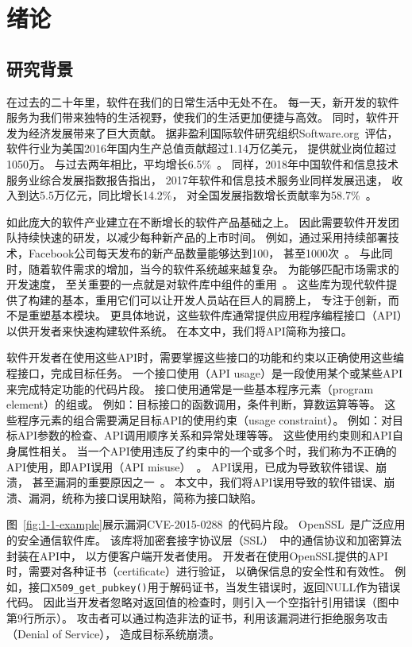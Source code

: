 \chapter{绪论}
\label{cha:intro}

\section{研究背景}
在过去的二十年里，软件在我们的日常生活中无处不在。
每一天，新开发的软件服务为我们带来独特的生活视野，使我们的生活更加便捷与高效。
同时，软件开发为经济发展带来了巨大贡献。
据非盈利国际软件研究组织Software.org~\cite{software-org}评估，
软件行业为美国2016年国内生产总值贡献超过1.14万亿美元，
提供就业岗位超过1050万。
与过去两年相比，平均增长6.5\%~\cite{2017-eco-report}。
同样，2018年中国软件和信息技术服务业综合发展指数报告指出，
2017年软件和信息技术服务业同样发展迅速，
收入到达5.5万亿元，同比增长14.2\%，
对全国发展指数增长贡献率为58.7\%~\cite{2018-china-report}。


如此庞大的软件产业建立在不断增长的软件产品基础之上。
因此需要软件开发团队持续快速的研发，以减少每种新产品的上市时间。
例如，通过采用持续部署技术，Facebook公司每天发布的新产品数量能够达到100，
甚至1000次~\cite{16-icse-continuous}。
与此同时，随着软件需求的增加，当今的软件系统越来越复杂。
为能够匹配市场需求的开发速度，
至关重要的一点就是对软件库中组件的重用~\cite{2011-icsr-reuse, 2013-cbse-reuse}。
这些库为现代软件提供了构建的基本，重用它们可以让开发人员站在巨人的肩膀上，
专注于创新，而不是重塑基本模块。
更具体地说，这些软件库通常提供应用程序编程接口（API）以供开发者来快速构建软件系统。
在本文中，我们将API简称为接口。


软件开发者在使用这些API时，需要掌握这些接口的功能和约束以正确使用这些编程接口，完成目标任务。
一个接口使用（API usage）是一段使用某个或某些API来完成特定功能的代码片段。
接口使用通常是一些基本程序元素（program element）的组或。
例如：目标接口的函数调用，条件判断，算数运算等等。
这些程序元素的组合需要满足目标API的使用约束（usage constraint）。
例如：对目标API参数的检查、API调用顺序关系和异常处理等等。
这些使用约束则和API自身属性相关。
当一个API使用违反了约束中的一个或多个时，我们称为不正确的API使用，即API误用（API misuse）~\cite{16-msr-mubench}。
API误用，已成为导致软件错误、崩溃，
甚至漏洞的重要原因之一~\cite{12-ccs-android,12-ccs-ssl,13-ccs-misuse,13-tosem-missing-call,14-apsys-case,15-icpc-api,16-ase-spec}。
本文中，我们将API误用导致的软件错误、崩溃、漏洞，统称为接口误用缺陷，简称为接口缺陷。


图~\ref{fig:1-1-example}展示漏洞CVE-2015-0288~\cite{CVE-2015-0288}的代码片段。
OpenSSL~\cite{openssl}是广泛应用的安全通信软件库。
该库将加密套接字协议层（SSL）~\cite{ssl}中的通信协议和加密算法封装在API中，
以方便客户端开发者使用。
开发者在使用OpenSSL提供的API时，需要对各种证书（certificate）进行验证，
以确保信息的安全性和有效性。
例如，接口\texttt{X509\_get\_pubkey()}用于解码证书，当发生错误时，返回NULL作为错误代码。
因此当开发者忽略对返回值的检查时，则引入一个空指针引用错误（图中第9行所示）。
攻击者可以通过构造非法的证书，利用该漏洞进行拒绝服务攻击（Denial of Service），
造成目标系统崩溃。



